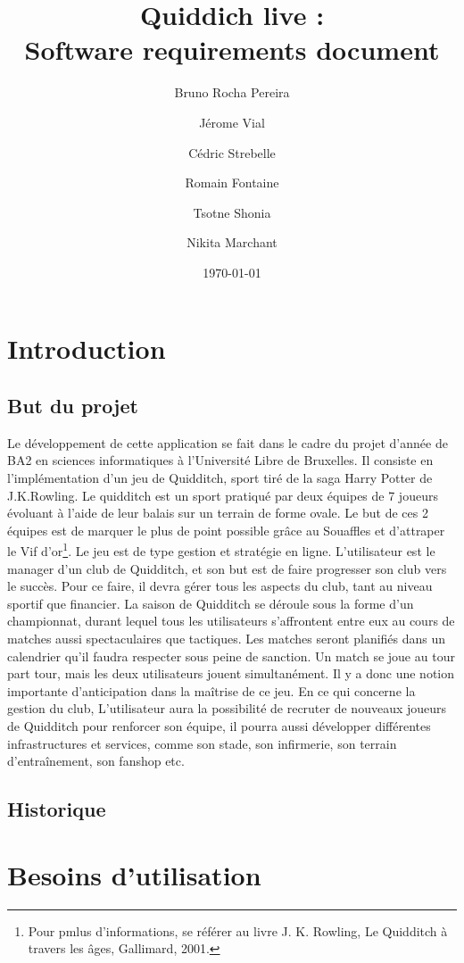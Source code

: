 \documentclass[a4paper]{article}
\title{Quiddich live : \\Software requirements document}
\author{Bruno Rocha Pereira \and Jérome Vial \and Cédric Strebelle \and
Romain Fontaine \and Tsotne Shonia \and Nikita Marchant}
\date{\today}
\begin{document}
\maketitle

\section{Introduction}
\subsection{But du projet}
Le développement de cette application se fait dans le cadre du projet d'année de BA2 en sciences informatiques à l'Université Libre de Bruxelles. Il consiste en l'implémentation d'un jeu de Quidditch, sport tiré de la saga Harry Potter de J.K.Rowling. 
Le quidditch est un sport pratiqué par deux équipes de 7 joueurs évoluant à l'aide de leur balais sur un terrain de forme ovale. Le but de ces 2 équipes est de marquer le plus de point possible grâce au Souaffles et d'attraper le Vif d'or\footnote{Pour pmlus d'informations, se référer au livre J. K. Rowling, Le Quidditch à travers les âges, Gallimard,‎ 2001.}. 
Le jeu est de type gestion et stratégie en ligne. L'\gls{utilisateur} est le manager d'un club de Quidditch, et son but est de faire progresser son club vers le succès. Pour ce faire, il devra gérer tous les aspects du club, tant au niveau sportif que financier. La saison de Quidditch se déroule sous la forme d'un championnat, durant lequel tous les \glspl{utilisateur} s'affrontent entre eux au cours de matches aussi spectaculaires que tactiques. Les matches seront planifiés dans un calendrier qu'il faudra respecter sous peine de sanction. Un match se joue au tour part tour, mais les deux \glspl{utilisateur} jouent simultanément. Il y a donc une notion importante d'anticipation dans la maîtrise de ce jeu. En ce qui concerne la gestion du club, L'\gls{utilisateur} aura la possibilité de recruter de nouveaux joueurs de Quidditch pour renforcer son équipe, il pourra aussi développer différentes infrastructures et services, comme son stade, son infirmerie, son terrain d'entraînement, son fanshop etc.

\printglossary[numberedsection]
\subsection{Historique}

\section{Besoins d'utilisation}
\end{document}
